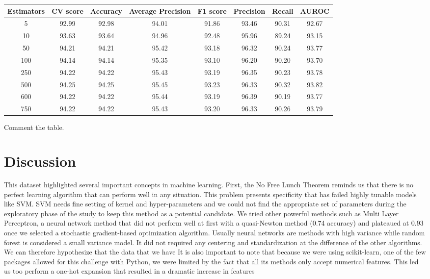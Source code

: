 \documentclass[11pt,a4paper]{article}
\begin{document}
\begin{table}[h]
\begin{center}
\begin{tabular}{|c|c|c|c|c|c|c|c|}
\hline
Estimators & CV score & Accuracy & Average Precision & F1 score & Precision & Recall & AUROC \\
\hline \hline
5 & 92.99 & 92.98 & 94.01 & 91.86 & 93.46 & 90.31 & 92.67 \\
10 & 93.63 & 93.64 & 94.96 & 92.48 & 95.96 & 89.24 & 93.15 \\
50 & 94.21 & 94.21 & 95.42 & 93.18 & 96.32 & 90.24 & 93.77 \\
100 & 94.14 & 94.14 & 95.35 & 93.10 & 96.20 & 90.20 & 93.70 \\
250 & 94.22 & 94.22 & 95.43 & 93.19 & 96.35 & 90.23 & 93.78 \\
500 & 94.25 & 94.25 & 95.45 & 93.23 & 96.33 & 90.32 & 93.82 \\
600 & 94.22 & 94.22 & 95.44 & 93.19 & 96.39 & 90.19 & 93.77 \\
750 & 94.22 & 94.22 & 95.43 & 93.20 & 96.33 & 90.26 & 93.79 \\
\hline
\end{tabular}
\end{center}
\end{table}

Comment the table.

\section{Discussion}

This dataset highlighted several important concepts in machine learning. First, the No Free Lunch Theorem reminds us that there is no perfect learning algorithm that can perform well in any situation. This problem presents specificity that has failed highly tunable models like SVM. SVM needs fine setting of kernel and hyper-parameters and we could not find the appropriate set of parameters during the exploratory phase of the study to keep this method as a potential candidate. We tried other powerful methods such as Multi Layer Perceptron, a neural network method that did not perform well at first with a quasi-Newton method (0.74 accuracy) and plateaued at 0.93 once we selected a stochastic gradient-based optimization algorithm. Usually neural networks are methods with high variance while random forest is considered a small variance model. It did not required any centering and standardization at the difference of the other algorithms.\\
We can therefore hypothesize that the data that we have 
It is also important to note that because we were using scikit-learn, one of the few packages allowed for this challenge with Python, we were limited by the fact that all its methods only accept numerical features. This led us too perform a one-hot expansion that resulted in a dramatic increase in features
\end{document}
